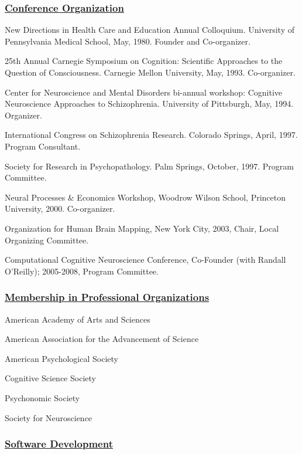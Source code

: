 \documentclass[10 pt]{article}
\begin{document}
\subsubsection*{\underline{Conference Organization}} \label{secCO}
    \smallskip

New Directions in Health Care and Education Annual Colloquium. University of Pennsylvania Medical School, May, 1980. Founder and Co-organizer.

25th Annual Carnegie Symposium on Cognition: Scientific Approaches to the Question of Consciousness. Carnegie Mellon University, May, 1993. Co-organizer.

Center for Neuroscience and Mental Disorders bi-annual workshop: Cognitive Neuroscience Approaches to Schizophrenia. University of Pittsburgh, May, 1994. Organizer.

International Congress on Schizophrenia Research. Colorado Springs, April, 1997. Program Consultant.

Society for Research in Psychopathology. Palm Springs, October, 1997. Program Committee.

Neural Processes \& Economics Workshop, Woodrow Wilson School, Princeton University, 2000. Co-organizer.

Organization for Human Brain Mapping, New York City, 2003, Chair, Local Organizing Committee.

Computational Cognitive Neuroscience Conference, Co-Founder (with Randall O’Reilly); 2005-2008, Program Committee.


\subsubsection*{\underline{Membership in Professional Organizations}} \label{secMiPO}
    \smallskip

American Academy of Arts and Sciences

American Association for the Advancement of Science

American Psychological Society

Cognitive Science Society

Psychonomic Society

Society for Neuroscience


\subsubsection*{\underline{Software Development}} \label{secSD}
    \smallskip
\end{document}

